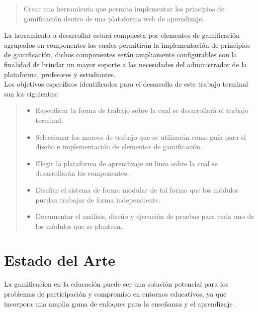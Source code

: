     \begin{quote}\hspace{0.135\linewidth}
    \colorbox{blue!05}{\parbox{\dimexpr0.73\linewidth}{\strut
        Crear una herramienta que permita implementar los principios
        de gamificación dentro de una plataforma web de aprendizaje.
    \strut}}
    \end{quote}

 \noindent La herramienta a desarrollar estará compuesta por elementos de gamificación
 agrupados en componentes los cuales permitirán la implementación de principios de 
 gamificación, dichos componentes serán ampliamente configurables con la finalidad 
 de brindar un mayor soporte a las necesidades del administrador de la plataforma, 
 profesores y estudiantes.\\

 Los objetivos específicos identificados para el desarrollo de este trabajo terminal
 son los siguientes:

    \begin{quote}
    \begin{itemize}%
    \item Especificar la forma de trabajo sobre la cual se desarrollará el
          trabajo terminal.

    \item Seleccionar los marcos de trabajo que se utilizarán como guía para
          el diseño e implementación de elementos de gamificación.

    \item Elegir la plataforma de aprendizaje en linea sobre la cual se
          desarrollarán los componentes.

    \item Diseñar el sistema de forma modular de tal forma que los módulos
          puedan trabajar de forma independiente.

    \item Documentar el análisis, diseño y ejecución de pruebas para cada
          uno de los módulos que se planteen.
    \end{itemize}
    \end{quote}

\section{Estado del Arte} \label{sec:estadoArte}

 La \gls{gamificacion} en la educación puede ser una solución potencial para los
 problemas de participación y compromiso en entornos educativos, ya que incorpora 
 una amplia gama de enfoques para la enseñanza y el aprendizaje \cite{Aldemir}.\\

